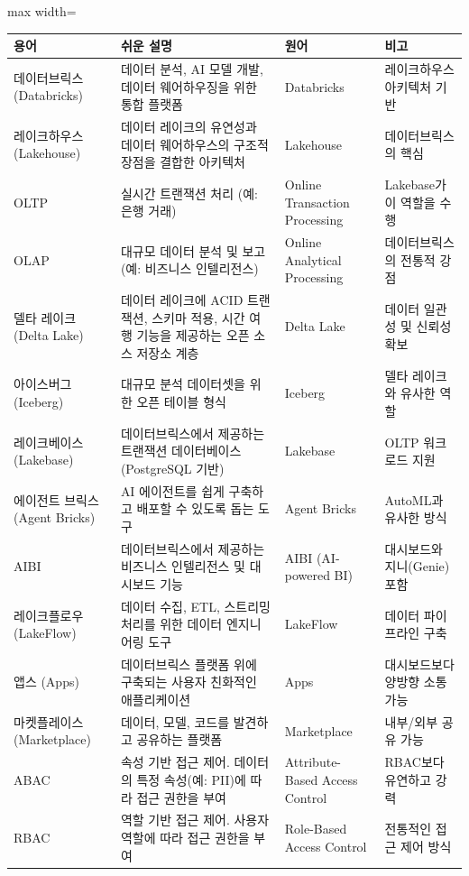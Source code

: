 \documentclass[11pt,a4paper]{article}
\theoremstyle{definition}
\begin{document}
\begin{adjustbox}{max width=\textwidth}
\begin{tabular}{llll}
\toprule
\textbf{용어} & \textbf{쉬운 설명} & \textbf{원어} & \textbf{비고} \\
\midrule
데이터브릭스 (Databricks) & 데이터 분석, AI 모델 개발, 데이터 웨어하우징을 위한 통합 플랫폼 & Databricks & 레이크하우스 아키텍처 기반 \\
레이크하우스 (Lakehouse) & 데이터 레이크의 유연성과 데이터 웨어하우스의 구조적 장점을 결합한 아키텍처 & Lakehouse & 데이터브릭스의 핵심 \\
OLTP & 실시간 트랜잭션 처리 (예: 은행 거래) & Online Transaction Processing & Lakebase가 이 역할을 수행 \\
OLAP & 대규모 데이터 분석 및 보고 (예: 비즈니스 인텔리전스) & Online Analytical Processing & 데이터브릭스의 전통적 강점 \\
델타 레이크 (Delta Lake) & 데이터 레이크에 ACID 트랜잭션, 스키마 적용, 시간 여행 기능을 제공하는 오픈 소스 저장소 계층 & Delta Lake & 데이터 일관성 및 신뢰성 확보 \\
아이스버그 (Iceberg) & 대규모 분석 데이터셋을 위한 오픈 테이블 형식 & Iceberg & 델타 레이크와 유사한 역할 \\
레이크베이스 (Lakebase) & 데이터브릭스에서 제공하는 트랜잭션 데이터베이스 (PostgreSQL 기반) & Lakebase & OLTP 워크로드 지원 \\
에이전트 브릭스 (Agent Bricks) & AI 에이전트를 쉽게 구축하고 배포할 수 있도록 돕는 도구 & Agent Bricks & AutoML과 유사한 방식 \\
AIBI & 데이터브릭스에서 제공하는 비즈니스 인텔리전스 및 대시보드 기능 & AIBI (AI-powered BI) & 대시보드와 지니(Genie) 포함 \\
레이크플로우 (LakeFlow) & 데이터 수집, ETL, 스트리밍 처리를 위한 데이터 엔지니어링 도구 & LakeFlow & 데이터 파이프라인 구축 \\
앱스 (Apps) & 데이터브릭스 플랫폼 위에 구축되는 사용자 친화적인 애플리케이션 & Apps & 대시보드보다 양방향 소통 가능 \\
마켓플레이스 (Marketplace) & 데이터, 모델, 코드를 발견하고 공유하는 플랫폼 & Marketplace & 내부/외부 공유 가능 \\
ABAC & 속성 기반 접근 제어. 데이터의 특정 속성(예: PII)에 따라 접근 권한을 부여 & Attribute-Based Access Control & RBAC보다 유연하고 강력 \\
RBAC & 역할 기반 접근 제어. 사용자 역할에 따라 접근 권한을 부여 & Role-Based Access Control & 전통적인 접근 제어 방식 \\

\end{tabular}
\end{adjustbox}
\end{document}
